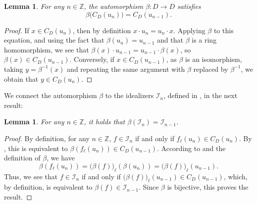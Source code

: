 \documentclass{amsart}
\newtheorem{lem}[equation]{Lemma}
\theoremstyle{definition}
\numberwithin{equation}{section}
\begin{document}
\begin{lem}\label{lem:betaCent}
For any $n \in \mathbb{Z}$,
the automorphism $\beta:D \to D$ satisfies
\[
\beta\bigl(C_D(u_n)\bigr) = C_D(u_{n-1}).
\]
\end{lem}
\begin{proof}
If $x \in C_D(u_n)$,
then by definition $x\cdot u_n = u_n\cdot x$.
Applying $\beta$ to this equation,
and using the fact that $\beta(u_n) = u_{n-1}$ and that $\beta$ is a ring homomorphism,
we see that $\beta(x) \cdot u_{n-1} = u_{n-1} \cdot \beta(x)$,
so $\beta(x) \in C_D(u_{n-1})$.
Conversely, if $x \in C_D(u_{n-1})$,
as $\beta$ is an isomorphism, taking $y=\beta^{-1}(x)$ and repeating the same argument with $\beta$ replaced by $\beta^{-1}$, we obtain that $y \in C_D(u_n)$.
\end{proof}

We connect the automorphism $\beta$ to the idealizers $\mathcal{I}_n$, defined in , in the next result:

\begin{lem}\label{lem:betaIn}
For any $n \in \mathbb{Z}$,
it holds that $\beta(\mathcal{I}_n) = \mathcal{I}_{n-1}$.
\end{lem}
\begin{proof}
By definition,
for any $n \in \mathbb{Z}$,
$f \in \mathcal{I}_n$ if and only if $f_{\ell}(u_n) \in C_D(u_n)$.
By ,
this is equivalent to $\beta(f_{\ell}(u_n)) \in C_D(u_{n-1})$.
According to  and the definition of $\beta$, we have
\[
\beta(f_{\ell}(u_n)) = \bigl(\beta(f)\bigr)_{\ell}(\beta(u_n)) = \bigl(\beta(f)\bigr)_{\ell}(u_{n-1}).
\]
Thus, we see that $f \in \mathcal{I}_n$ if and only if
$\bigl(\beta(f)\bigr)_{\ell}(u_{n-1}) \in C_D(u_{n-1})$,
which, by definition, is equivalent to $\beta(f) \in \mathcal{I}_{n-1}$.
Since $\beta$ is bijective, this proves the result.
\end{proof}
\end{document}
